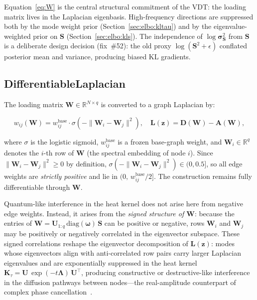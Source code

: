 \documentclass[11pt,a4paper]{article}
\newcommand{\Lmat}{\mathbf{L}}
\newcommand{\Umat}{\mathbf{U}}
\newcommand{\Smat}{\mathbf{S}}
\newcommand{\Wmat}{\mathbf{W}}
\newcommand{\R}{\mathbb{R}}
\newcommand{\T}{^{\intercal}}
\begin{document}
Equation~\eqref{eq:W} is the central structural commitment of the VDT:
the loading matrix lives in the Laplacian eigenbasis.
High-frequency directions are suppressed both by the mode weight prior
(Section~\ref{sec:elbo:kltau}) and by the eigenvalue-weighted prior on $\Smat$
(Section~\ref{sec:elbo:kls}).  The independence of $\log\boldsymbol{\sigma}^2_{\Smat}$
from $\Smat$ is a deliberate design decision (fix~\#52): the old proxy
$\log(\Smat^2+\epsilon)$ conflated posterior mean and variance, producing
biased KL gradients.

\subsection{DifferentiableLaplacian}
\label{sec:architecture:laplacian}

The loading matrix $\Wmat\in\R^{N\times q}$ is converted to a graph Laplacian by:

\begin{equation}
  w_{ij}(\Wmat) = w_{ij}^{\text{base}} \cdot \sigma\!\left(-\|\Wmat_i - \Wmat_j\|^2\right),
  \quad
  \Lmat(\mathbf{z}) = \mathbf{D}(\Wmat) - \mathbf{A}(\Wmat),
  \label{eq:difflaplacian}
\end{equation}

where $\sigma$ is the logistic sigmoid, $w_{ij}^{\text{base}}$ is a frozen
base-graph weight, and $\Wmat_i \in \R^q$ denotes the $i$-th row of $\Wmat$
(the spectral embedding of node $i$).  Since $\|\Wmat_i - \Wmat_j\|^2 \geq 0$
by definition, $\sigma(-\|\Wmat_i - \Wmat_j\|^2) \in (0, 0.5]$, so all edge
weights are \emph{strictly positive} and lie in $(0,\, w_{ij}^{\text{base}}/2]$.
The construction remains fully differentiable through $\Wmat$.

Quantum-like interference in the heat kernel does not arise here from
negative edge weights.  Instead, it arises from the \emph{signed structure
of $\Wmat$}: because the entries of $\Wmat = \Umat_{1:q}\,\mathrm{diag}(\boldsymbol{\omega})\,\Smat$
can be positive or negative, rows $\Wmat_i$ and $\Wmat_j$ may be
positively or negatively correlated in the eigenvector subspace.
These signed correlations reshape the eigenvector decomposition of
$\Lmat(\mathbf{z})$: modes whose eigenvectors align with anti-correlated
row pairs carry larger Laplacian eigenvalues and are exponentially
suppressed in the heat kernel $\mathbf{K}_\tau = \Umat\,\exp(-t\boldsymbol{\Lambda})\,\Umat\T$,
producing constructive or destructive-like interference in the diffusion
pathways between nodes---the real-amplitude counterpart of complex phase
cancellation~\cite{aaronson2013}.
\end{document}
